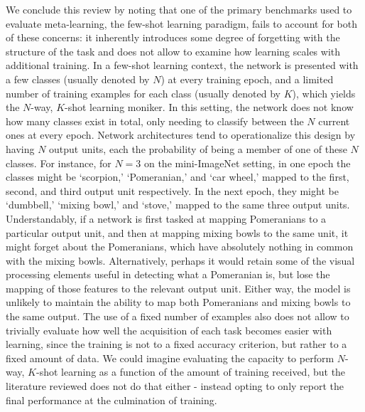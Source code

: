 We conclude this review by noting that one of the primary benchmarks used to evaluate meta-learning, the few-shot learning paradigm, fails to account for both of these concerns: it inherently introduces some degree of forgetting with the structure of the task and does not allow to examine how learning scales with additional training. In a few-shot learning context, the network is presented with a few classes (usually denoted by $N$) at every training epoch, and a limited number of training examples for each class (usually denoted by $K$), which yields the $N$-way, $K$-shot learning moniker. In this setting, the network does not know how many classes exist in total, only needing to classify between the $N$ current ones at every epoch. Network architectures tend to operationalize this design by having $N$ output units, each the probability of being a member of one of these $N$ classes. For instance, for $N=3$ on the mini-ImageNet \parencite{Vinyals2016} setting, in one epoch the classes might be ‘scorpion,' ‘Pomeranian,' and ‘car wheel,' mapped to the first, second, and third output unit respectively. In the next epoch, they might be ‘dumbbell,' ‘mixing bowl,' and ‘stove,' mapped to the same three output units. Understandably, if a network is first tasked at mapping Pomeranians to a particular output unit, and then at mapping mixing bowls to the same unit, it might forget about the Pomeranians, which have absolutely nothing in common with the mixing bowls. Alternatively, perhaps it would retain some of the visual processing elements useful in detecting what a Pomeranian is, but lose the mapping of those features to the relevant output unit. Either way, the model is unlikely to maintain the ability to map both Pomeranians and mixing bowls to the same output. The use of a fixed number of examples also does not allow to trivially evaluate how well the acquisition of each task becomes easier with learning, since the training is not to a fixed accuracy criterion, but rather to a fixed amount of data. We could imagine evaluating the capacity to perform $N$-way, $K$-shot learning as a function of the amount of training received, but the literature reviewed does not do that either - instead opting to only report the final performance at the culmination of training. 
